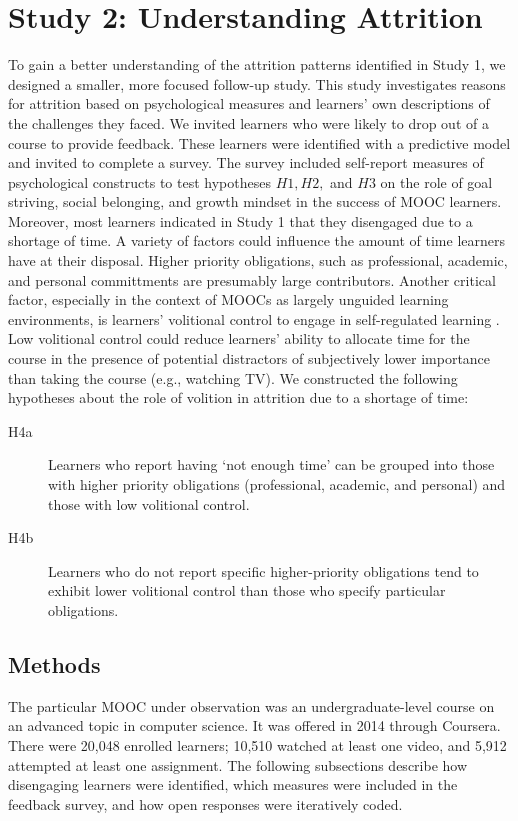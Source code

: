 \documentclass{sigchi}\usepackage[]{graphicx}\usepackage[]{color}
\begin{document}
\section{Study 2: Understanding Attrition}

To gain a better understanding of the attrition patterns identified in Study 1, we designed a smaller, more focused follow-up study. This study investigates reasons for attrition based on psychological measures and learners' own descriptions of the challenges they faced. We invited learners who were likely to drop out of a course to provide feedback. These learners were identified with a predictive model and invited to complete a survey. The survey included self-report measures of psychological constructs to test hypotheses $H1, H2,$ and $H3$ on the role of goal striving, social belonging, and growth mindset in the success of MOOC learners. Moreover, most learners indicated in Study 1 that they disengaged due to a shortage of time. A variety of factors could influence the amount of time learners have at their disposal. Higher priority obligations, such as professional, academic, and personal committments are presumably large contributors. Another critical factor, especially in the context of MOOCs as largely unguided learning environments, is learners' volitional control to engage in self-regulated learning \cite{corno2001volitional}. Low volitional control could reduce learners' ability to allocate time for the course in the presence of potential distractors of subjectively lower importance than taking the course (e.g., watching TV). We constructed the following hypotheses about the role of volition in attrition due to a shortage of time:

\begin{description}
  \item[H4a] Learners who report having `not enough time' can be grouped into those with higher priority obligations (professional, academic, and personal) and those with low volitional control.
  \item[H4b] Learners who do not report specific higher-priority obligations tend to exhibit lower volitional control than those who specify particular obligations.
\end{description}  

\subsection{Methods}

The particular MOOC under observation was an undergraduate-level course on an advanced topic in computer science. It was offered in 2014 through Coursera. There were  20,048 enrolled learners; 10,510 watched at least one video, and 5,912 attempted at least one assignment. The following subsections describe how disengaging learners were identified, which measures were included in the feedback survey, and how open responses were iteratively coded.
\end{document}
